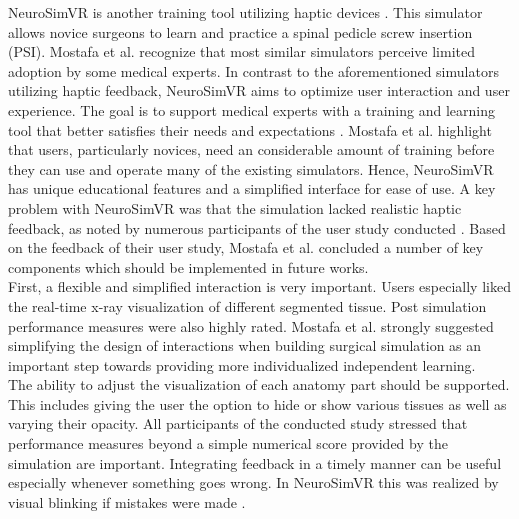 NeuroSimVR is another training tool utilizing haptic devices \cite{RN71}. This simulator allows
novice surgeons to learn and practice a spinal pedicle screw insertion (PSI). Mostafa
et al. \cite{RN71} recognize that most similar simulators perceive limited adoption by some medical
experts. In contrast to the aforementioned simulators utilizing haptic feedback, NeuroSimVR aims to optimize user interaction
and user experience. The goal is to support medical experts with a training and learning
tool that better satisfies their needs and expectations \cite{RN71}.
Mostafa et al. highlight that users, particularly novices, need an considerable amount
of training before they can use and operate many of the existing simulators. Hence,
NeuroSimVR has unique educational features and a simplified interface for ease of use.
A key problem with NeuroSimVR was that the simulation lacked realistic haptic feedback,
as noted by numerous participants of the user study conducted \cite{RN71}.
Based on the feedback of their user study, Mostafa et al. concluded a number of key components which should be implemented in future works.
\\ First, a flexible and simplified interaction is very important. Users especially liked the
real-time x-ray visualization of different segmented tissue. Post simulation performance
measures were also highly rated. Mostafa et al.
strongly suggested simplifying the design of interactions when building surgical simulation as an important step towards providing more individualized independent learning.
\\ The ability to adjust the visualization of each anatomy part should be supported. This
includes giving the user the option to hide or show various tissues as well as varying their
opacity. All participants of the conducted study stressed that performance measures
beyond a simple numerical score provided by the simulation are important. Integrating
feedback in a timely manner can be useful especially whenever something goes wrong.
In NeuroSimVR this was realized by visual blinking if mistakes were made \cite{RN71}.